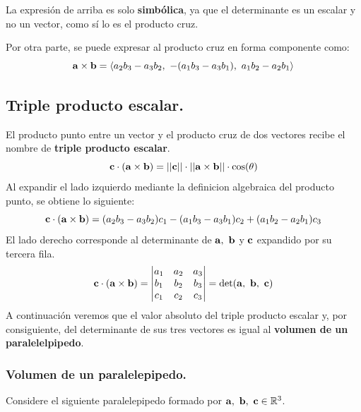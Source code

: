 \documentclass[12pt]{article}
\begin{document}
La expresión de arriba es solo \textbf{simbólica}, ya que el determinante es un escalar y no un vector, como sí lo es el producto cruz.

Por otra parte, se puede expresar al producto cruz en forma componente como:
\[
  \mathbf{a} \times \mathbf{b} = \langle
                                   a_{2}b_{3} - a_{3}b_{2}, \ - (a_{1}b_{3} - a_{3}b_{1}), \ a_{1}b_{2} - a_{2}b_{1}
                                 \rangle
\]

\subsection{Triple producto escalar.}

El producto punto entre un vector y el producto cruz de dos vectores recibe el nombre de \textbf{triple producto escalar}.
\[
  \mathbf{c} \cdot (\mathbf{a} \times \mathbf{b}) = ||\mathbf{c}|| \cdot ||\mathbf{a} \times \mathbf{b}|| \cdot \cos(\theta)
\]
Al expandir el lado izquierdo mediante la definicion algebraica del producto punto, se obtiene lo siguiente:
\[
  \mathbf{c} \cdot (\mathbf{a} \times \mathbf{b}) = (a_{2}b_{3} - a_{3}b_{2})c_{1} - (a_{1}b_{3} - a_{3}b_{1})c_{2} 
                                                    + (a_{1}b_{2} - a_{2}b_{1})c_{3}
\]
El lado derecho corresponde al determinante de $\mathbf{a}, \ \mathbf{b}$ y $\mathbf{c}$ expandido por su tercera fila.
\[
\mathbf{c} \cdot (\mathbf{a} \times \mathbf{b}) =
\begin{vmatrix}
a_{1} & a_{2} & a_{3} \\
b_{1} & b_{2} & b_{3} \\
c_{1} & c_{2} & c_{3}
\end{vmatrix} =
\det(\mathbf{a}, \ \mathbf{b}, \ \mathbf{c})
\]
A continuación veremos que el valor absoluto del triple producto escalar y, por consiguiente, del determinante de sus tres vectores es igual al \textbf{volumen de un paralelelpipedo}.

\subsubsection{Volumen de un paralelepipedo.}

Considere el siguiente paralelepipedo formado por $\mathbf{a}, \ \mathbf{b}, \ \mathbf{c} \in \mathbb{R}^{3}$.
\end{document}
